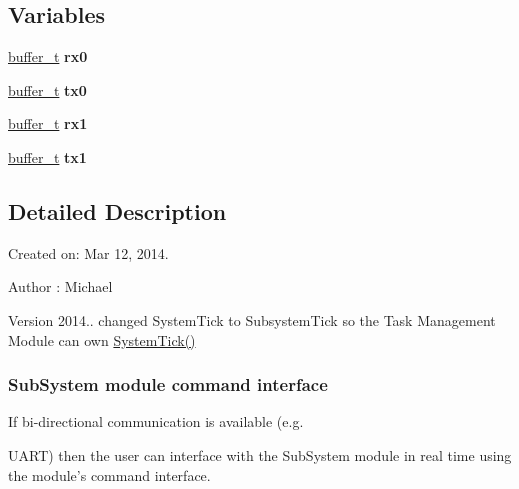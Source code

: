 \subsection*{Variables}
\begin{DoxyCompactItemize}
\item 
\hypertarget{group__subsys_ga85637dd904a74841f18c9d65eca37c35}{\hyperlink{structbuffer__t}{buffer\+\_\+t} {\bfseries rx0}}\label{group__subsys_ga85637dd904a74841f18c9d65eca37c35}

\item 
\hypertarget{group__subsys_ga831fd91ae9bffe2e1e335d61414fbb6d}{\hyperlink{structbuffer__t}{buffer\+\_\+t} {\bfseries tx0}}\label{group__subsys_ga831fd91ae9bffe2e1e335d61414fbb6d}

\item 
\hypertarget{group__subsys_ga510a4fd51e1e3242d95a27544607288b}{\hyperlink{structbuffer__t}{buffer\+\_\+t} {\bfseries rx1}}\label{group__subsys_ga510a4fd51e1e3242d95a27544607288b}

\item 
\hypertarget{group__subsys_ga2d48e4797a64844f13a98cf99d6d77bc}{\hyperlink{structbuffer__t}{buffer\+\_\+t} {\bfseries tx1}}\label{group__subsys_ga2d48e4797a64844f13a98cf99d6d77bc}

\end{DoxyCompactItemize}


\subsection{Detailed Description}
Created on\+: Mar 12, 2014. 

\begin{DoxyAuthor}{Author}
\+: Michael
\end{DoxyAuthor}
\begin{DoxyVersion}{Version}
2014.. changed System\+Tick to Subsystem\+Tick so the Task Management Module can own \hyperlink{group__task_gafd2aa563748d1ede229e5867753ead5d}{System\+Tick()} 
\end{DoxyVersion}
\hypertarget{sys_receive}{}\subsubsection{Sub\+System module command interface}\label{sys_receive}
If bi-\/directional communication is available (e.\+g.

U\+A\+R\+T) then the user can interface with the Sub\+System module in real time using the module's command interface.

